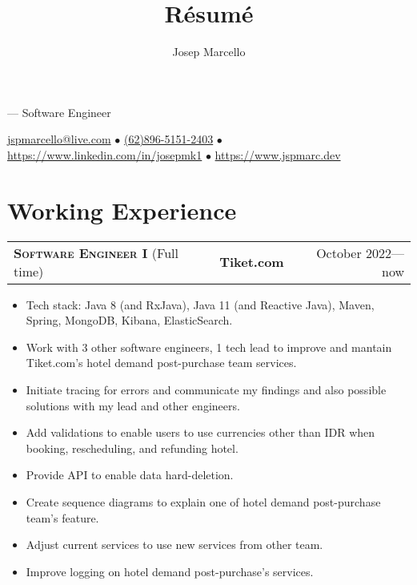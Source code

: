 \documentclass[10pt]{article}
\makeatletter
\renewcommand{\maketitle}{
    \rmfamily
    \noindent
    {\Huge \theauthor} ---
    \sffamily
    Software Engineer

    \vspace{0.1em}
    \noindent
    \href{mailto:jspmarcello@live.com}{jspmarcello@live.com} $\bullet$
    \href{https://wa.me/6289651512403}{(62)896-5151-2403} $\bullet$
    \href{https://www.linkedin.com/in/josepmk1}{https://www.linkedin.com/in/josepmk1} $\bullet$
    \href{https://www.jspmarc.dev}{https://www.jspmarc.dev}
}
\newcommand{\workExpVspace}{1em}
\newcommand{\workExp}[6]{
    \noindent \begin{tabularx}{\textwidth}{@{}X c|r}
        \textbf{\textsc{#5}} (#2) & \textbf{#1} & #3---#4
    \end{tabularx}

    {#6}
    \vspace{\workExpVspace}
}
\makeatother
\begin{document}
\title{R\'esum\'e}
\author{Josep Marcello}

\maketitle

\section{Working Experience}

\workExp
    {Tiket.com}
    {Full time}
    {October 2022}
    {now}
    {Software Engineer I}
    {
        \begin{itemize}
            \item Tech stack: Java 8 (and RxJava), Java 11 (and Reactive Java), Maven, Spring,
                MongoDB, Kibana, ElasticSearch.
            \item Work with 3 other software engineers, 1 tech lead to improve and mantain
                Tiket.com's hotel demand post-purchase team services.
            \item Initiate tracing for errors and communicate my findings and also possible
                solutions with my lead and other engineers.
            \item Add validations to enable users to use currencies other than IDR when booking,
                rescheduling, and refunding hotel.
            \item Provide API to enable data hard-deletion.
            \item Create sequence diagrams to explain one of hotel demand post-purchase team's
                feature.
            \item Adjust current services to use new services from other team.
            \item Improve logging on hotel demand post-purchase's services.
        \end{itemize}
    }
\end{document}
